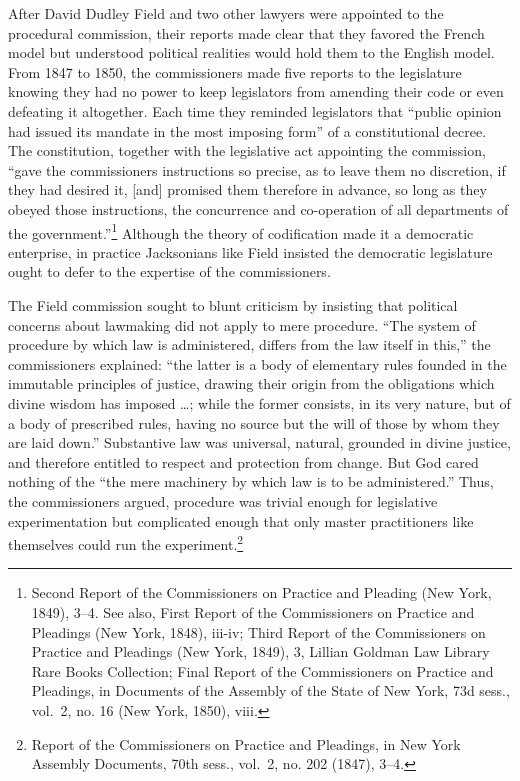 \documentclass[12pt,]{article}
\let\rmarkdownfootnote\footnote%
\def\footnote{\protect\rmarkdownfootnote}
\begin{document}
After David Dudley Field and two other lawyers were appointed to the
procedural commission, their reports made clear that they favored the
French model but understood political realities would hold them to the
English model. From 1847 to 1850, the commissioners made five reports to
the legislature knowing they had no power to keep legislators from
amending their code or even defeating it altogether. Each time they
reminded legislators that ``public opinion had issued its mandate in the
most imposing form'' of a constitutional decree. The constitution,
together with the legislative act appointing the commission, ``gave the
commissioners instructions so precise, as to leave them no discretion,
if they had desired it, {[}and{]} promised them therefore in advance, so
long as they obeyed those instructions, the concurrence and co-operation
of all departments of the government.''\footnote{Second Report of the
  Commissioners on Practice and Pleading (New York, 1849), 3--4. See
  also, First Report of the Commissioners on Practice and Pleadings (New
  York, 1848), iii-iv; Third Report of the Commissioners on Practice and
  Pleadings (New York, 1849), 3, Lillian Goldman Law Library Rare Books
  Collection; Final Report of the Commissioners on Practice and
  Pleadings, in Documents of the Assembly of the State of New York, 73d
  sess., vol.~2, no. 16 (New York, 1850), viii.} Although the theory of
codification made it a democratic enterprise, in practice Jacksonians
like Field insisted the democratic legislature ought to defer to the
expertise of the commissioners.

The Field commission sought to blunt criticism by insisting that
political concerns about lawmaking did not apply to mere procedure.
``The system of procedure by which law is administered, differs from the
law itself in this,'' the commissioners explained: ``the latter is a
body of elementary rules founded in the immutable principles of justice,
drawing their origin from the obligations which divine wisdom has
imposed \ldots; while the former consists, in its very nature, but of a
body of prescribed rules, having no source but the will of those by whom
they are laid down.'' Substantive law was universal, natural, grounded
in divine justice, and therefore entitled to respect and protection from
change. But God cared nothing of the ``the mere machinery by which law
is to be administered.'' Thus, the commissioners argued, procedure was
trivial enough for legislative experimentation but complicated enough
that only master practitioners like themselves could run the
experiment.\footnote{Report of the Commissioners on Practice and
  Pleadings, in New York Assembly Documents, 70th sess., vol.~2, no. 202
  (1847), 3--4.}
\end{document}
